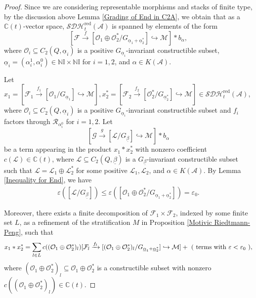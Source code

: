 \documentclass[12pt]{amsart}
\theoremstyle{definition}
\numberwithin{equation}{section}
\begin{document}
\begin{proof}   
    Since we are considering representable morphisms and stacks of finite type, by the discussion above Lemma \ref{Grading of End in C2A}, we obtain that as a $ \mathbb{C}(t) $-vector space, $ \mathcal{SDH}^{\mathrm{red}}_t(\mathcal{A}) $ is spanned by elements of the form
    \[[\mathcal{F} \xrightarrow{f}[\mathcal{O}_1\oplus \mathcal{O}_2^*/G_{\underline{\alpha}_1+\underline{\alpha}_2^*}]\hookrightarrow \mathcal{M}] * b_{\alpha},\]
    where $ \mathcal{O}_i \subseteq C_2(Q, \underline{\alpha}_i) $ is a positive $ G_{\underline{\alpha}_i} $-invariant constructible subset, $ \underline{\alpha}_i = (\alpha_i^1,\alpha_i^0) \in \mathbb{N}\mathbb{I} \times \mathbb{N}\mathbb{I} $ for  $ i=1,2 $, and $ \alpha \in K(\mathcal{A}) $. 

    Let $ x_1= [\mathcal{F}_1 \xrightarrow{f_1}[\mathcal{O}_1/G_{\underline{\alpha}_1}]\hookrightarrow\mathcal{M}], x_2^*= [\mathcal{F}_2 \xrightarrow{f_2}[\mathcal{O}_2^*/G_{\underline{\alpha}_2^*}]\hookrightarrow\mathcal{M}] \in \mathcal{SDH}^{\mathrm{red}}_t(\mathcal{A}) $, where $ \mathcal{O}_i \subseteq C_2(Q, \underline{\alpha}_i) $ is a positive $ G_{\underline{\alpha}_i} $-invariant constructible subset and $ f_i $ factors through $ \mathcal{R}_{\alpha_i^0} $  for $ i=1,2 $. 
    Let
    \[[\mathcal{G} \xrightarrow{g}[\mathcal{L}/G_{\underline{\beta}}] \hookrightarrow \mathcal{M}] * b_{\alpha}\]
    be a term appearing in the product $ x_1 * x_2^* $ with nonzero coefficient $ c(\mathcal{L}) \in \mathbb{C}(t) $,  where $ \mathcal{L}\subseteq C_2(Q, \underline{\beta})  $ is a $ G_{\underline{\beta}} $-invariant constructible subset such that $ \mathcal{L} = \mathcal{L}_1 \oplus \mathcal{L}_2^* $ for some positive $ \mathcal{L}_1, \mathcal{L}_2 $, and $ \alpha \in K(\mathcal{A}) $. 
    By Lemma \ref{Inequality for End}, we have
    \begin{align*}
        \varepsilon([\mathcal{L}/G_{\underline{\beta}}]) \leqslant \varepsilon([\mathcal{O}_1 \oplus \mathcal{O}_2^*/G_{\underline{\alpha}_1+\underline{\alpha}_2^*}]) = \varepsilon_0.
    \end{align*}
    
    Moreover, there exists a finite decomposition of $ \mathcal{F}_1 \times \mathcal{F}_2 $, indexed by some finite set $ L $, as a refinement of the stratification $ M $ in Proposition \ref{Motivic Riedtmann-Peng}, such that
    \begin{align*}
        x_1 * x_2^* = \sum_{l \in L} c((\mathcal{O}_1 \oplus \mathcal{O}_2^*)_l) [\mathcal{F}_l\xrightarrow{f_l}[(\mathcal{O}_1 \oplus \mathcal{O}_2^*)_l/G_{\underline{\alpha}_1+\underline{\alpha}_2^*}]\hookrightarrow \mathcal{M}] + \text{ ( terms with $ \varepsilon < \varepsilon_0 $ )},
    \end{align*}
    where $ (\mathcal{O}_1 \oplus \mathcal{O}_2^*)_l \subseteq \mathcal{O}_1 \oplus \mathcal{O}_2^* $ is a constructible subset with nonzero $ c((\mathcal{O}_1 \oplus \mathcal{O}_2^*)_l) \in \mathbb{C}(t) $. 


\end{proof}
\end{document}
